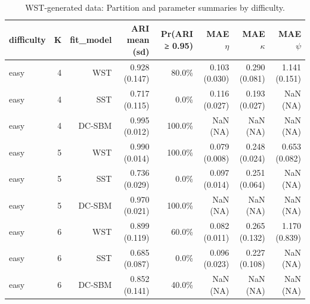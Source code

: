 \begin{table}[!h]
\centering
\caption{WST-generated data: Partition and parameter summaries by difficulty.\\\label{tab:wst-appx-diff-partition}}
\centering
\begin{tabular}[t]{lrrrrrrr}
\toprule
difficulty & K & fit_model & ARI mean (sd) & Pr(ARI ≥ 0.95) & MAE $\eta$ & MAE $\kappa$ & MAE $\psi$\\
\midrule
easy & 4 & WST & 0.928 (0.147) & 80.0\% & 0.103 (0.030) & 0.290 (0.081) & 1.141 (0.151)\\
easy & 4 & SST & 0.717 (0.115) & 0.0\% & 0.116 (0.027) & 0.193 (0.027) & NaN (NA)\\
easy & 4 & DC-SBM & 0.995 (0.012) & 100.0\% & NaN (NA) & NaN (NA) & NaN (NA)\\
easy & 5 & WST & 0.990 (0.014) & 100.0\% & 0.079 (0.008) & 0.248 (0.024) & 0.653 (0.082)\\
easy & 5 & SST & 0.736 (0.029) & 0.0\% & 0.097 (0.014) & 0.251 (0.064) & NaN (NA)\\
easy & 5 & DC-SBM & 0.970 (0.021) & 100.0\% & NaN (NA) & NaN (NA) & NaN (NA)\\
easy & 6 & WST & 0.899 (0.119) & 60.0\% & 0.082 (0.011) & 0.265 (0.132) & 1.170 (0.839)\\
easy & 6 & SST & 0.685 (0.087) & 0.0\% & 0.096 (0.023) & 0.227 (0.108) & NaN (NA)\\
easy & 6 & DC-SBM & 0.852 (0.141) & 40.0\% & NaN (NA) & NaN (NA) & NaN (NA)\\
\bottomrule
\end{tabular}
\end{table}
